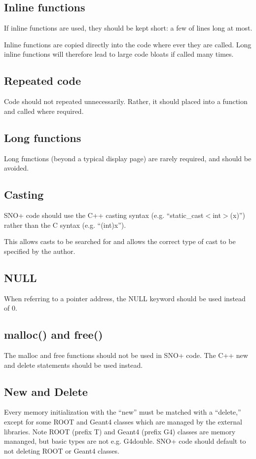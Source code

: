 \documentclass[11pt]{article}
\begin{document}
\subsection{Inline functions}
If inline functions are used, they should be kept short: a few of lines long at most.

Inline functions are copied directly into the code where ever they are called. Long inline functions will therefore lead to large code bloats if called many times.

\subsection{Repeated code}
Code should not repeated unnecessarily. Rather, it should placed into a function and called where required.

\subsection{Long functions}
Long functions (beyond a typical display page) are rarely required, and should be avoided.

\subsection{Casting}
SNO+ code should use the C++ casting syntax (e.g. ``static\_cast$<$int$>$(x)'') rather than the C syntax (e.g. ``(int)x'').

This allows casts to be searched for and allows the correct type of cast to be specified by the author.

\subsection{NULL}
When referring to a pointer address, the NULL keyword should be used instead of 0.

\subsection{malloc() and free()}
The malloc and free functions should not be used in SNO+ code. The C++ new and delete statements should be used instead.

\subsection{New and Delete}
Every memory initialization with the ``new'' must be matched with a ``delete,'' except for some ROOT and Geant4 classes which are managed by the external libraries. Note ROOT (prefix T) and Geant4 (prefix G4) classes are memory mananged, but basic types are not e.g. G4double. SNO+ code should default to not deleting ROOT or Geant4 classes.
\end{document}
